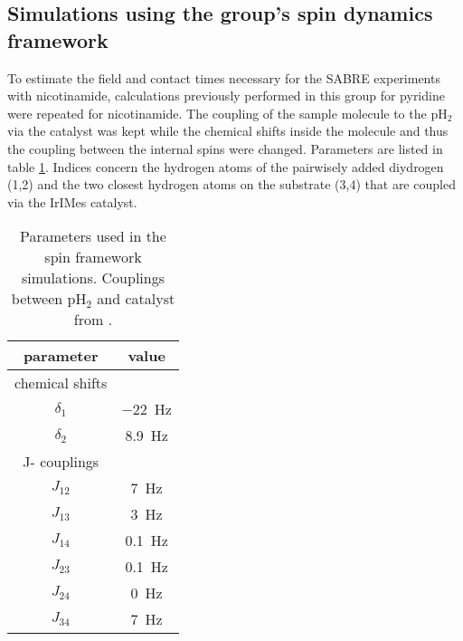     \subsection{Simulations using the group's spin dynamics framework}
    To estimate the field and contact times necessary for the SABRE experiments with nicotinamide, calculations previously performed in this group for pyridine \cite{knecht_spin_2014} were repeated for nicotinamide. The coupling of the sample molecule to the pH$_2$ via the catalyst was kept \cite{green_theory_2012-1} while the chemical shifts inside the molecule and thus the coupling between the internal spins were changed. Parameters are listed in table \ref{table:simulations:spinFrameworkParameters}. Indices concern the hydrogen atoms of the pairwisely added diydrogen (1,2) and the two closest hydrogen atoms on the substrate (3,4) that are coupled via the IrIMes catalyst.
        \begin{table}
        \centering
            \begin{tabular}{|c|c|}
                \hline
                parameter & value\\
                \hline
                chemical shifts & \\
                \hline
                $\delta_1$ & \SI{-22}{\hertz}\\
                $\delta_2$ & \SI{8.9}{\hertz}\\
                \hline
                J- couplings & \\
                \hline
                $J_{12}$ & \SI{7}{\hertz}\\
                $J_{13}$ & \SI{3}{\hertz}\\
                $J_{14}$ & \SI{0.1}{\hertz}\\
                $J_{23}$ & \SI{0.1}{\hertz}\\
                $J_{24}$ & \SI{0}{\hertz}\\
                $J_{34}$ & \SI{7}{\hertz}\\
                \hline
            \end{tabular}
            \caption[Spin framework parameters]{Parameters used in the spin framework simulations. Couplings between pH$_2$ and catalyst from \cite{green_theory_2012-1}. }
            \label{table:simulations:spinFrameworkParameters}
        \end{table}
